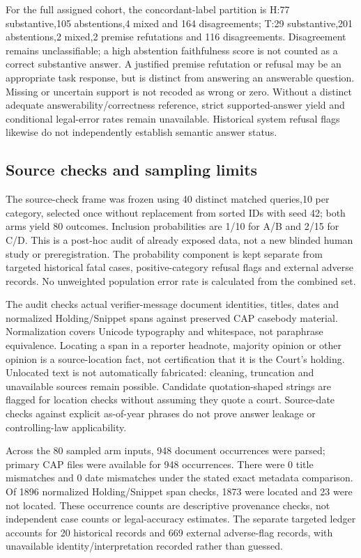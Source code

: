For the full assigned cohort, the concordant-label partition is H:77 substantive,105 abstentions,4 mixed and 164 disagreements; T:29 substantive,201 abstentions,2 mixed,2 premise refutations and 116 disagreements. Disagreement remains unclassifiable; a high abstention faithfulness score is not counted as a correct substantive answer. A justified premise refutation or refusal may be an appropriate task response, but is distinct from answering an answerable question. Missing or uncertain support is not recoded as wrong or zero. Without a distinct adequate answerability/correctness reference, strict supported-answer yield and conditional legal-error rates remain unavailable. Historical system refusal flags likewise do not independently establish semantic answer status.

\subsection{Source checks and sampling limits}
The source-check frame was frozen using 40 distinct matched queries,10 per category, selected once without replacement from sorted IDs with seed 42; both arms yield 80 outcomes. Inclusion probabilities are 1/10 for A/B and 2/15 for C/D. This is a post-hoc audit of already exposed data, not a new blinded human study or preregistration. The probability component is kept separate from targeted historical fatal cases, positive-category refusal flags and external adverse records. No unweighted population error rate is calculated from the combined set.

The audit checks actual verifier-message document identities, titles, dates and normalized Holding/Snippet spans against preserved CAP casebody material. Normalization covers Unicode typography and whitespace, not paraphrase equivalence. Locating a span in a reporter headnote, majority opinion or other opinion is a source-location fact, not certification that it is the Court's holding. Unlocated text is not automatically fabricated: cleaning, truncation and unavailable sources remain possible. Candidate quotation-shaped strings are flagged for location checks without assuming they quote a court. Source-date checks against explicit as-of-year phrases do not prove answer leakage or controlling-law applicability.

Across the 80 sampled arm inputs, 948 document occurrences were parsed; primary CAP files were available for 948 occurrences. There were 0 title mismatches and 0 date mismatches under the stated exact metadata comparison. Of 1896 normalized Holding/Snippet span checks, 1873 were located and 23 were not located. These occurrence counts are descriptive provenance checks, not independent case counts or legal-accuracy estimates. The separate targeted ledger accounts for 20 historical records and 669 external adverse-flag records, with unavailable identity/interpretation recorded rather than guessed.

